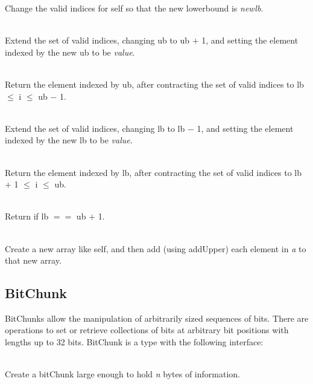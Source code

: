 \begin{desc}
    Change the valid indices for self so that the new lowerbound is {\it newlb}.
  \item[\kw{operation} addUpper\/\LB{}value \CO{} T\/\RB{}]~\\
    Extend the set of valid indices, changing ub to 
    ub $+$ 1, and setting the element indexed by the new
    ub to be {\it value}.
  \item[\kw{operation} removeUpper \returns{} \/\LB{}T\/\RB{}]~\\
    Return the element indexed by ub, after contracting 
    the set of valid indices to lb $\leq$ i $\leq$ ub $-$ 1.
  \item[\kw{operation} addLower\/\LB{}value \CO{} T\/\RB{}]~\\
    Extend the set of valid indices, changing lb to 
    lb $-$ 1, and setting
    the element indexed by the new lb to be {\it value}.
  \item[\kw{operation} removeLower \returns{} \/\LB{}T\/\RB{}]~\\
    Return the element indexed by lb, after contracting 
    the set of valid indices to lb $+$ 1 $\leq$ i $\leq$ ub.
  \item[\kw{function}  empty \returns{} \/\LB{}\tn{Boolean}\/\RB{}]~\\
    Return  if lb $==$ ub $+$ 1.
  \item[\kw{operation} catenate\/\LB{}a \CO{} RIS\/\RB{} \returns{} \/\LB{}r \CO{} aNewArrayType\/\RB{}]~\\
    Create a new array like self, and then add (using addUpper) each element
    in {\it a} to that new array.
\end{desc}

\subsection{BitChunk}
\label{builtin BitChunk}
BitChunks allow the manipulation of arbitrarily sized sequences of bits.
There are operations to set or retrieve collections of bits at arbitrary bit
positions with lengths up to 32 bits.
BitChunk is a type with the following interface:

\begin{desc}
  \item[\kw{export} \kw{operation} create\/\LB{}n \CO{} \tn{Integer}\/\RB{} \returns{} \/\LB{}Bitchunk\/\RB{}]~\\
    Create a bitChunk large enough to hold {\it n\/} bytes of information.
\end{desc}


